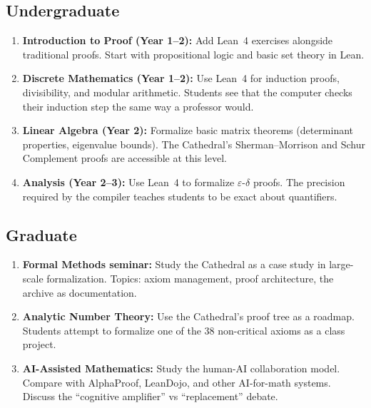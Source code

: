 \documentclass[11pt,a4paper]{article}
\begin{document}
\subsection{Undergraduate}

\begin{enumerate}
  \item \textbf{Introduction to Proof (Year 1--2):} Add Lean~4
    exercises alongside traditional proofs. Start with propositional
    logic and basic set theory in Lean.

  \item \textbf{Discrete Mathematics (Year 1--2):} Use Lean~4 for
    induction proofs, divisibility, and modular arithmetic.
    Students see that the computer checks their induction step
    the same way a professor would.

  \item \textbf{Linear Algebra (Year 2):} Formalize basic matrix
    theorems (determinant properties, eigenvalue bounds). The
    Cathedral's Sherman--Morrison and Schur Complement proofs
    are accessible at this level.

  \item \textbf{Analysis (Year 2--3):} Use Lean~4 to formalize
    $\varepsilon$-$\delta$ proofs. The precision required by the
    compiler teaches students to be exact about quantifiers.
\end{enumerate}

\subsection{Graduate}

\begin{enumerate}
  \item \textbf{Formal Methods seminar:} Study the Cathedral as
    a case study in large-scale formalization. Topics:
    axiom management, proof architecture, the archive as
    documentation.

  \item \textbf{Analytic Number Theory:} Use the Cathedral's
    proof tree as a roadmap. Students attempt to formalize
    one of the 38 non-critical axioms as a class project.

  \item \textbf{AI-Assisted Mathematics:} Study the human-AI
    collaboration model. Compare with AlphaProof, LeanDojo,
    and other AI-for-math systems. Discuss the ``cognitive
    amplifier'' vs ``replacement'' debate.
\end{enumerate}
\end{document}
